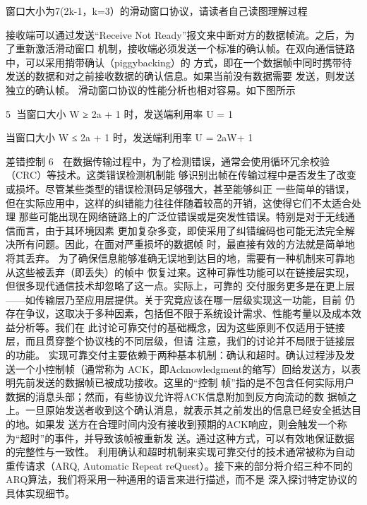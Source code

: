          窗口大小为7(2k-1，k=3）的滑动窗口协议，请读者自己读图理解过程

接收端可以通过发送“Receive Not Ready”报文来中断对方的数据帧流。之后，为了重新激活滑动窗口
机制，接收端必须发送一个标准的确认帧。在双向通信链路中，可以采用捎带确认（piggybacking）的
方式，即在一个数据帧中同时携带待发送的数据和对之前接收数据的确认信息。如果当前没有数据需要
发送，则发送独立的确认帧。
滑动窗口协议的性能分析也相对容易。如下图所示

                                                         5
当窗口大小 W ≥ 2a + 1 时，发送端利用率 U = 1




当窗口大小 W ≤ 2a + 1 时，发送端利用率 U = 2aW+ 1   ​




差错控制
                                           6
   在数据传输过程中，为了检测错误，通常会使用循环冗余校验（CRC）等技术。这类错误检测机制能
够识别出帧在传输过程中是否发生了改变或损坏。尽管某些类型的错误检测码足够强大，甚至能够纠正
一些简单的错误，但在实际应用中，这样的纠错能力往往伴随着较高的开销，这使得它们不太适合处理
那些可能出现在网络链路上的广泛位错误或是突发性错误。特别是对于无线通信而言，由于其环境因素
更加复杂多变，即使采用了纠错编码也可能无法完全解决所有问题。因此，在面对严重损坏的数据帧
时，最直接有效的方法就是简单地将其丢弃。
   为了确保信息能够准确无误地到达目的地，需要有一种机制来可靠地从这些被丢弃（即丢失）的帧中
恢复过来。这种可靠性功能可以在链接层实现，但很多现代通信技术却忽略了这一点。实际上，可靠的
交付服务更多是在更上层——如传输层乃至应用层提供。关于究竟应该在哪一层级实现这一功能，目前
仍存在争议，这取决于多种因素，包括但不限于系统设计需求、性能考量以及成本效益分析等。我们在
此讨论可靠交付的基础概念，因为这些原则不仅适用于链接层，而且贯穿整个协议栈的不同层级，但请
注意，我们的讨论并不局限于链接层的功能。
   实现可靠交付主要依赖于两种基本机制：确认和超时。确认过程涉及发送一个小控制帧（通常称为
ACK，即Acknowledgment的缩写）回给发送方，以表明先前发送的数据帧已被成功接收。这里的“控制
帧”指的是不包含任何实际用户数据的消息头部；然而，有些协议允许将ACK信息附加到反方向流动的数
据帧之上。一旦原始发送者收到这个确认消息，就表示其之前发出的信息已经安全抵达目的地。如果发
送方在合理时间内没有接收到预期的ACK响应，则会触发一个称为“超时”的事件，并导致该帧被重新发
送。通过这种方式，可以有效地保证数据的完整性与一致性。
   利用确认和超时机制来实现可靠交付的技术通常被称为自动重传请求（ARQ, Automatic Repeat
reQuest）。接下来的部分将介绍三种不同的ARQ算法，我们将采用一种通用的语言来进行描述，而不是
深入探讨特定协议的具体实现细节。

